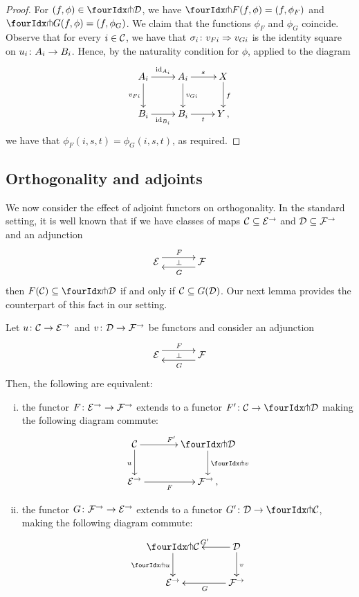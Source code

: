 \documentclass[reqno,10pt,a4paper,oneside]{amsart}
\begin{document}
\begin{proof} For $(f, \phi) \in \liftr{\cal{D}}$, we have $\liftr{F}(f, \phi) = (f, \phi_F)$ and $\liftr{G}(f, \phi) = (f, \phi_G)$.
We claim that the functions $\phi_F$ and $\phi_G$ coincide. Observe that 
for every $i \in \cal{C}$, we have that $\sigma_i \co v_{Fi}  \Rightarrow v_{Gi}$ is the identity square on $u_i
\co A_i \to B_i$. Hence, by the naturality condition for $\phi$, applied to the diagram 
\[
\xymatrix{
A_i \ar[r]^{\id_{A_i}} \ar[d]_{v_{Fi}}  & A_i \ar[d]^{v_{Gi}} \ar[r]^{s}  & X \ar[d]^{f} \\
B_i \ar[r]_{\id_{B_i}} & B_i \ar[r]_{t} & Y \, ,}
\]
we have  that $\phi_F(i, s, t) = \phi_G(i, s, t)$, as required.
\end{proof} 

\subsection*{Orthogonality and adjoints}
We now consider the effect of adjoint functors on orthogonality. In the standard setting, it is well known that if 
we have classes of maps $\cal{C} \subseteq \cal{E}^\to$ and $\cal{D} \subseteq \cal{F}^\to$ and an adjunction
\[
\xymatrix@C+1em{
  \cal{E}
  \ar@<5pt>[r]^{F}
  \ar@{}[r]|{\bot}
&
  \cal{F}
  \ar@<5pt>[l]^{G}
}
\]
then $F(\cal{C}) \subseteq \liftl{\cal{D}}$ if and only if $\cal{C} \subseteq G(\cal{D})$. Our next lemma provides the counterpart of this fact in our setting.




\begin{proposition} \label{lift-of-adjunction} 
Let $u \co \cal{C} \to \cal{E}^{\to}$ and $v \co \cal{D} \to \cal{F}^{\to}$ be functors and consider an adjunction
\[
\xymatrix@C+1em{
  \cal{E}
  \ar@<5pt>[r]^{F}
  \ar@{}[r]|{\bot}
&
  \cal{F}
  \ar@<5pt>[l]^{G}
}
\]
Then, the following are equivalent:
\begin{enumerate}[(i)] 
\item the  functor $F \co \cal{E}^\to \to \cal{F}^\to$ extends to a functor $F' \co \cal{C} \to \liftl{\cal{D}}$ making the following diagram commute:
\[
\xymatrix@C=1.2cm{
  \cal{C}
  \ar[r]^{F'}
  \ar[d]_{u}
&
  \liftl{\cal{D}}
  \ar[d]^{\liftl{v}}
\\
  \cal{E}^{\to}
  \ar[r]_-{F}
&
  \cal{F}^{\to}\, ,}
\]
\item the functor $G \co \cal{F}^\to \to \cal{E}^\to$ extends to a functor $G' \co \cal{D} \to \liftr{\cal{C}}$, making the following diagram commute:
\[
\xymatrix{
  \liftr{\cal{C}}
  \ar[d]_{\liftr{u}}
&
  \cal{D}
  \ar[l]_{G'} 
  \ar[d]^{v}
\\
  \cal{E}^{\to}
&
  \cal{F}^{\to}
  \ar[l]^{G}
}
\]
\end{enumerate}
\end{proposition}
\end{document}
